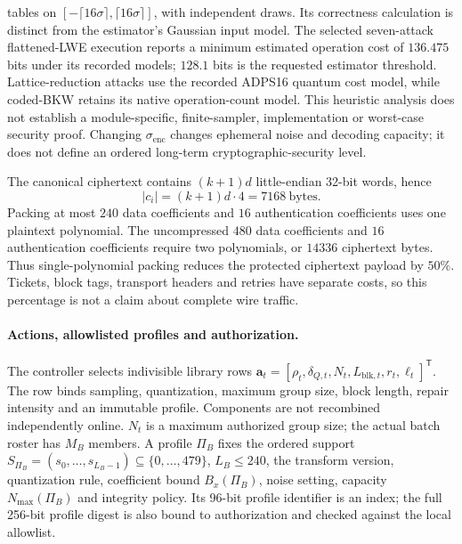 tables on $[-\lceil16\sigma\rceil,\lceil16\sigma\rceil]$, with independent
draws. Its correctness calculation is distinct from the estimator's Gaussian
input model. The selected seven-attack flattened-LWE execution reports a
minimum estimated operation cost of $136.475$ bits under its recorded models;
$128.1$ bits is the requested estimator threshold. Lattice-reduction attacks
use the recorded ADPS16 quantum cost model, while coded-BKW retains its native
operation-count model. This heuristic analysis does not establish a
module-specific, finite-sampler, implementation or worst-case security proof.
Changing $\sigma_{\mathrm{enc}}$ changes ephemeral noise and decoding capacity;
it does not define an ordered long-term cryptographic-security level.

The canonical ciphertext contains $(k+1)d$ little-endian 32-bit words, hence
\begin{equation}
 |c_i|=(k+1)d\cdot4=7168\ \text{bytes}.
 \label{eq:daahe_protocol_ciphertext_bytes}
\end{equation}
Packing at most $240$ data coefficients and $16$ authentication coefficients
uses one plaintext polynomial. The uncompressed $480$ data coefficients and
$16$ authentication coefficients require two polynomials, or $14336$ ciphertext
bytes. Thus single-polynomial packing reduces the protected ciphertext payload
by $50\%$. Tickets, block tags, transport headers and retries have separate
costs, so this percentage is not a claim about complete wire traffic.

\paragraph{Actions, allowlisted profiles and authorization.}
The controller selects indivisible library rows
$\boldsymbol{a}_t=[\rho_t,\delta_{Q,t},N_t,L_{\mathrm{blk},t},r_t,\ell_t]^{\mathsf T}$.
The row binds sampling, quantization, maximum group size, block length, repair
intensity and an immutable profile. Components are not recombined independently
online. $N_t$ is a maximum authorized group size; the actual batch roster has
$M_B$ members. A profile $\Pi_B$ fixes the ordered support
$S_{\Pi_B}=(s_0,\ldots,s_{L_B-1})\subseteq\{0,\ldots,479\}$,
$L_B\leq240$, the transform version, quantization rule, coefficient bound
$B_x(\Pi_B)$, noise setting, capacity $N_{\max}(\Pi_B)$ and integrity policy.
Its 96-bit profile identifier is an index; the full 256-bit profile digest is
also bound to authorization and checked against the local allowlist.

